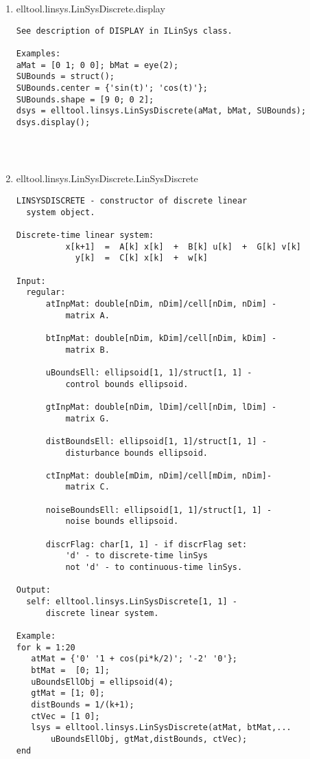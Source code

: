 \begin{enumerate}
\begin{lstlisting}
\end{lstlisting}
\fontfamily{\familydefault}
\selectfont
\item {elltool.linsys.LinSysDiscrete.display}
\selectfont
\begin{lstlisting}
See description of DISPLAY in ILinSys class.

Examples:
aMat = [0 1; 0 0]; bMat = eye(2);
SUBounds = struct();
SUBounds.center = {'sin(t)'; 'cos(t)'};
SUBounds.shape = [9 0; 0 2];
dsys = elltool.linsys.LinSysDiscrete(aMat, bMat, SUBounds);
dsys.display();




\end{lstlisting}
\fontfamily{\familydefault}
\selectfont
\item {elltool.linsys.LinSysDiscrete.LinSysDiscrete}
\selectfont
\begin{lstlisting}
LINSYSDISCRETE - constructor of discrete linear
  system object.

Discrete-time linear system:
          x[k+1]  =  A[k] x[k]  +  B[k] u[k]  +  G[k] v[k]
            y[k]  =  C[k] x[k]  +  w[k]

Input:
  regular:
      atInpMat: double[nDim, nDim]/cell[nDim, nDim] -
          matrix A.

      btInpMat: double[nDim, kDim]/cell[nDim, kDim] -
          matrix B.

      uBoundsEll: ellipsoid[1, 1]/struct[1, 1] -
          control bounds ellipsoid.

      gtInpMat: double[nDim, lDim]/cell[nDim, lDim] -
          matrix G.

      distBoundsEll: ellipsoid[1, 1]/struct[1, 1] -
          disturbance bounds ellipsoid.

      ctInpMat: double[mDim, nDim]/cell[mDim, nDim]-
          matrix C.

      noiseBoundsEll: ellipsoid[1, 1]/struct[1, 1] -
          noise bounds ellipsoid.

      discrFlag: char[1, 1] - if discrFlag set:
          'd' - to discrete-time linSys
          not 'd' - to continuous-time linSys.

Output:
  self: elltool.linsys.LinSysDiscrete[1, 1] -
      discrete linear system.

Example:
for k = 1:20
   atMat = {'0' '1 + cos(pi*k/2)'; '-2' '0'};
   btMat =  [0; 1];
   uBoundsEllObj = ellipsoid(4);
   gtMat = [1; 0];
   distBounds = 1/(k+1);
   ctVec = [1 0];
   lsys = elltool.linsys.LinSysDiscrete(atMat, btMat,...
       uBoundsEllObj, gtMat,distBounds, ctVec);
end





\end{lstlisting}
\end{enumerate}
